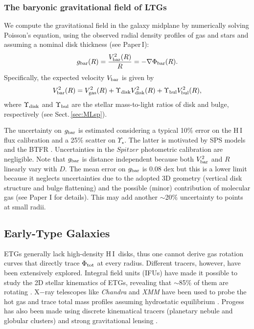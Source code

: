 \documentclass[apjl, twocolappendix]{emulateapj}
\newcommand{\hi } {{\rm H}\,{\small\rm I} \,}
\begin{document}
\subsubsection{The baryonic gravitational field of LTGs}

We compute the gravitational field in the galaxy midplane by numerically solving Poisson's equation, using the observed radial density profiles of gas and stars and assuming a nominal disk thickness (see Paper\,I):
\begin{equation}\label{Eq:gbar}
 g_{\rm bar}(R) = \dfrac{V_{\rm bar}^{2}(R)}{R} = -\nabla \Phi_{\rm bar}(R).
\end{equation}
Specifically, the expected velocity $V_{\rm bar}$ is given by
\begin{equation}
 V_{\rm bar}^2(R) = V_{\rm gas}^2(R) + \Upsilon_{\rm disk}V_{\rm disk}^2(R) + \Upsilon_{\rm bul}V_{\rm bul}^2(R),
\end{equation}
where $\Upsilon_{\rm disk}$ and $\Upsilon_{\rm bul}$ are the stellar mass-to-light ratios of disk and bulge, respectively (see Sect.\,\ref{sec:MLsp}).

The uncertainty on $g_{\rm bar}$ is estimated considering a typical 10$\%$ error on the \hi flux calibration and a 25$\%$ scatter on $\Upsilon_{\star}$. The latter is motivated by SPS models \citep{McGaugh2014, Meidt2014, Schombert2014a} and the BTFR \citep{McGaugh2015, Lelli2016}. Uncertainties in the $Spitzer$ photometric calibration are negligible. Note that $g_{\rm bar}$ is distance independent because both $V_{\rm bar}^{2}$ and $R$ linearly vary with $D$. The mean error on $g_{\rm bar}$ is 0.08 dex but this is a lower limit because it neglects uncertainties due to the adopted 3D geometry (vertical disk structure and bulge flattening) and the possible (minor) contribution of molecular gas (see Paper I for details). This may add another $\sim$20$\%$ uncertainty to points at small radii.

\subsection{Early-Type Galaxies}\label{sec:ETGData}

ETGs generally lack high-density \hi disks, thus one cannot derive gas rotation curves that directly trace $\Phi_{\rm tot}$ at every radius. Different tracers, however, have been extensively explored. Integral field units (IFUs) have made it possible to study the 2D stellar kinematics of ETGs, revealing that $\sim$85$\%$ of them are rotating \citep[see][for a review]{Cappellari2016}. X$-$ray telescopes like \emph{Chandra} and \emph{XMM} have been used to probe the hot gas and trace total mass profiles assuming hydrostatic equilibrium \citep[see][for a review]{Buote2012}. Progess has also been made using discrete kinematical tracers (planetary nebule and globular clusters) and strong gravitational lensing \citep[see][for a review]{Gerhard2013}.
\end{document}
